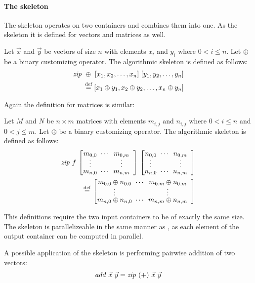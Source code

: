 \paragraph{The \zip skeleton}
The \zip skeleton operates on two containers and combines them into one.
As the \map skeleton it is defined for vectors and matrices as well.
\begin{definition}
  \label{definition:zip}
  Let $\vec{x}$ and $\vec{y}$ be vectors of size $n$ with elements $x_i$ and $y_i$ where $0 < i \leq n$.
  Let $\oplus$ be a binary customizing operator.
  The algorithmic skeleton \zip is defined as follows:
  \begin{equation*}
    \begin{split}
      \text{\textit{zip}}\ \oplus\ [x_1, x_2, \dots, x_n]\ [y_1, y_2, \dots, y_n]\\
      \stackrel{\textrm{\scriptsize def}}{=} [x_1 \oplus y_1, x_2 \oplus y_2, \dots, x_n \oplus y_n]
    \end{split}
  \end{equation*}
\end{definition}
\noindent
Again the definition for matrices is similar:
\begin{definition}
  \label{definition:zip:matrix}
  Let $M$ and $N$ be $n\times m$ matrices with elements $m_{i,j}$ and $n_{i,j}$ where $0 < i \leq n$ and $0 < j \leq m$.
  Let $\oplus$ be a binary customizing operator.
  The algorithmic skeleton \zip is defined as follows:
  \begin{equation*}
    \begin{split}
      \zip\ f\ {\DottedMatrix{m_{0,0}}{m_{0,m}}{m_{n,0}}{m_{n,m}}}\
            {\DottedMatrix{n_{0,0}}{n_{0,m}}{n_{n,0}}{n_{n,m}}} \\
      \eqdef \DottedMatrix{m_{0,0} \oplus n_{0,0}}{m_{0,m} \oplus n_{0,m}}{m_{n,0} \oplus n_{n,0}}{m_{n,m} \oplus n_{n,m}}
    \end{split}
  \end{equation*}
\end{definition}
\noindent
This definitions require the two input containers to be of exactly the same size.
The \zip skeleton is parallelizeable in the same manner as \map, as each element of the output container can be computed in parallel.

A possible application of the \zip skeleton is performing pairwise addition of two vectors:
\begin{align*}
  add\ \vec{x}\ \vec{y} = \text{\textit{zip}}\ (+)\ \vec{x}\ \vec{y}
\end{align*}


